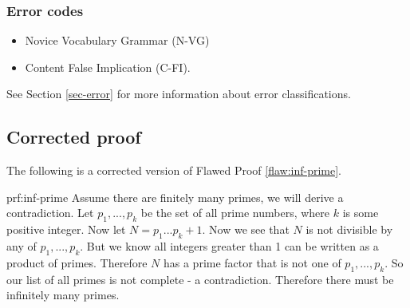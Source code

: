  
\subsubsection{Error codes}
\begin{itemize}
    \item Novice Vocabulary Grammar (N-VG)
	\item 	Content False Implication (C-FI). 
\end{itemize}
See Section \ref{sec-error} for more information about error classifications.

\clearpage
\subsection{Corrected proof}

The following is a corrected version of Flawed Proof \ref{flaw:inf-prime}. %

\begin{prf}{prf:inf-prime} %
Assume there are finitely many primes, we will derive a contradiction. Let $p_1, ..., p_k$ be the set of all prime numbers, where $k$ is some positive integer. Now let $N = p_1...p_k + 1$. Now we see that $N$ is not divisible by any of $p_1, ..., p_k$. But we know all integers greater than 1 can be written as a product of primes. Therefore $N$ has a prime factor that is not one of $p_1, ..., p_k$. So our list of all primes is not complete - a contradiction. Therefore there must be infinitely many primes. 
\end{prf}